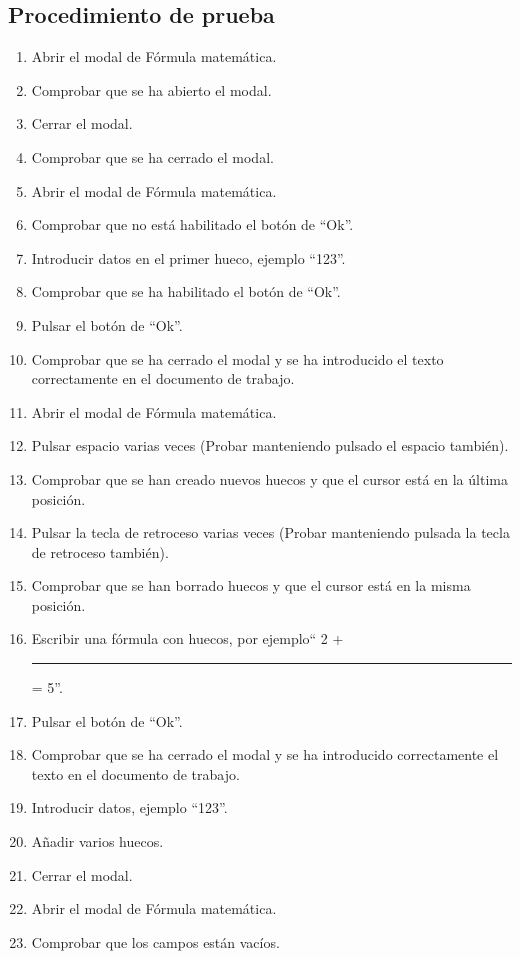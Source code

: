 \subsection{Procedimiento de prueba}
\label{procedimientoPruebas:mate}
\begin{enumerate}
    \item Abrir el modal de Fórmula matemática.
    \item Comprobar que se ha abierto el modal.
    \item Cerrar el modal.
    \item Comprobar que se ha cerrado el modal.
    \item Abrir el modal de Fórmula matemática.
    \item Comprobar que no está habilitado el botón de ``Ok''.
    \item Introducir datos en el primer hueco, ejemplo ``123''.
    \item Comprobar que se ha habilitado el botón de ``Ok''.
    \item Pulsar el botón de ``Ok''.
    \item Comprobar que se ha cerrado el modal y se ha introducido el texto correctamente en el documento de trabajo.
    \item Abrir el modal de Fórmula matemática.
    \item Pulsar espacio varias veces (Probar manteniendo pulsado el espacio también).
    \item Comprobar que se han creado nuevos huecos y que el cursor está en la última posición.
    \item Pulsar la tecla de retroceso varias veces (Probar manteniendo pulsada la tecla de retroceso también).
    \item Comprobar que se han borrado huecos y que el cursor está en la misma posición.
    \item Escribir una fórmula con huecos, por ejemplo`` 2 + \rule{10mm}{0.1mm} = 5''.
    \item Pulsar el botón de ``Ok''.
    \item Comprobar que se ha cerrado el modal y se ha introducido correctamente el texto en el documento de trabajo.
    \item Introducir datos, ejemplo ``123''.
    \item Añadir varios huecos.
    \item Cerrar el modal.
    \item Abrir el modal de Fórmula matemática.
    \item Comprobar que los campos están vacíos.
\end{enumerate}


